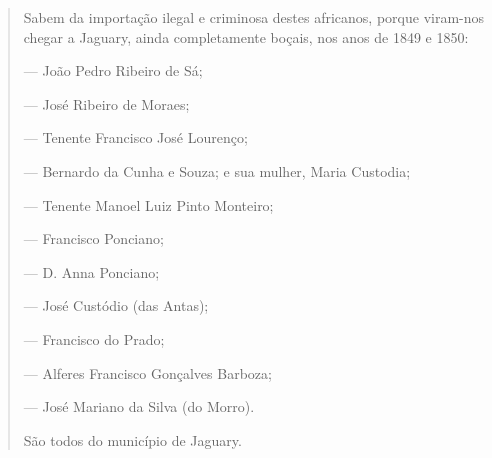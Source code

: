 \begin{quote}
Sabem da importação ilegal e criminosa destes africanos, porque
viram-nos chegar a Jaguary, ainda completamente boçais, nos anos de 1849
e 1850:

--- João Pedro Ribeiro de Sá;

--- José Ribeiro de Moraes;

--- Tenente Francisco José Lourenço;

--- Bernardo da Cunha e Souza; e sua mulher, Maria Custodia;

--- Tenente Manoel Luiz Pinto Monteiro;

--- Francisco Ponciano;

--- D. Anna Ponciano;

--- José Custódio (das Antas);

--- Francisco do Prado;

--- Alferes Francisco Gonçalves Barboza;

--- José Mariano da Silva (do Morro).

São todos do município de Jaguary.


\end{quote}
